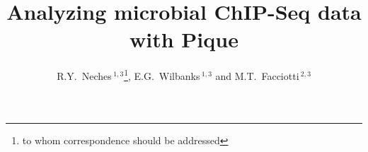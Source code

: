 \documentclass{bioinfo}
\begin{document}

\title[In a fit of pique]{Analyzing microbial ChIP-Seq data with
  Pique} \author[Neches
\textit{et~al}]{R.Y.~Neches\,$^{1,3}$\footnote{to whom correspondence
    should be addressed}, E.G.~Wilbanks\,$^{1,3}$ and
  M.T.~Facciotti\,$^{2,3}$
  \address{$^{1}$Microbiology Graduate Group, University of California, Davis.\\
    $^{2}$Department of Biomedical Engineering, University of
    California, Davis.\\$^{3}$Genome Center, University of California,
    Davis.}}



\maketitle

\newcommand{\imsize}{1.0\columnwidth}
\end{document}
